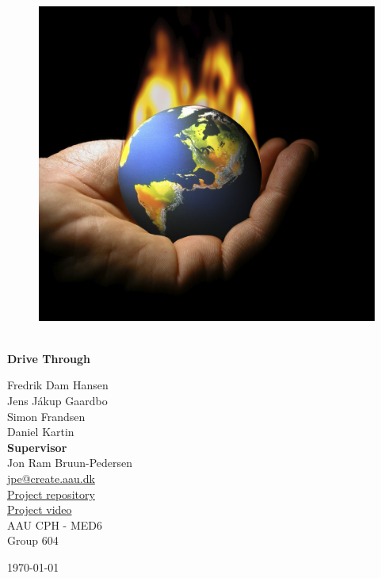 \begin{titlepage}
			
\addtolength{\voffset}{2cm}

\begin{figure}[H]
\centering
\vspace{2cm}	%
\includegraphics[width=0.8\linewidth]{figure/Frontpage/frontpage}
\end{figure}

\mbox{}
\vfill
\renewcommand{\familydefault}{\sfdefault} \normalfont %
\HRule\\[0.1cm]
\textbf{{{\Huge Drive Through}}} \hspace{0.15cm}\\
\HRule\smallskip{}
\begin{multicols}{2}
{\Large Fredrik Dam Hansen\\Jens Jákup Gaardbo\\Simon Frandsen\\Daniel Kartin\columnbreak}\\
\setlength{\parskip}{2.4cm}
{\Large{\textbf{Supervisor}\\Jon Ram Bruun-Pedersen\\\href{mailto:jpe@create.aau.dk}{\color{blue}jpe@create.aau.dk}}}\medskip\\
\href{https://github.com/roadmandam/medialogyp6}{\color{blue}Project repository}\\
\href{https://www.youtube.com/watch?v=Rl-HKPNP9ZY}{\color{blue}Project video}\medskip
\\\small AAU CPH - 
MED6 \\
Group 604\\
\end{multicols}
\today
\renewcommand{\familydefault}{\rmdefault} \normalfont %
\end{titlepage}


